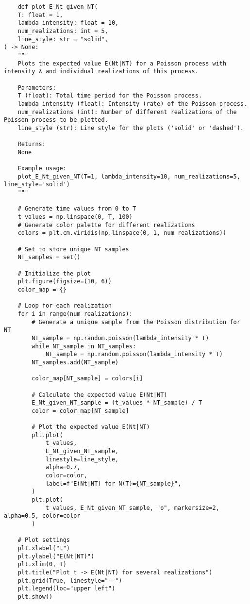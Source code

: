 \documentclass[12pt,letterpaper]{article}
\theoremstyle{definition}
\begin{document}
\begin{lstlisting}
    def plot_E_Nt_given_NT(
    T: float = 1,
    lambda_intensity: float = 10,
    num_realizations: int = 5,
    line_style: str = "solid",
) -> None:
    """
    Plots the expected value E(Nt|NT) for a Poisson process with intensity λ and individual realizations of this process.

    Parameters:
    T (float): Total time period for the Poisson process.
    lambda_intensity (float): Intensity (rate) of the Poisson process.
    num_realizations (int): Number of different realizations of the Poisson process to be plotted.
    line_style (str): Line style for the plots ('solid' or 'dashed').

    Returns:
    None

    Example usage:
    plot_E_Nt_given_NT(T=1, lambda_intensity=10, num_realizations=5, line_style='solid')
    """

    # Generate time values from 0 to T
    t_values = np.linspace(0, T, 100)
    # Generate color palette for different realizations
    colors = plt.cm.viridis(np.linspace(0, 1, num_realizations))

    # Set to store unique NT samples
    NT_samples = set()

    # Initialize the plot
    plt.figure(figsize=(10, 6))
    color_map = {}

    # Loop for each realization
    for i in range(num_realizations):
        # Generate a unique sample from the Poisson distribution for NT
        NT_sample = np.random.poisson(lambda_intensity * T)
        while NT_sample in NT_samples:
            NT_sample = np.random.poisson(lambda_intensity * T)
        NT_samples.add(NT_sample)

        color_map[NT_sample] = colors[i]

        # Calculate the expected value E(Nt|NT)
        E_Nt_given_NT_sample = (t_values * NT_sample) / T
        color = color_map[NT_sample]

        # Plot the expected value E(Nt|NT)
        plt.plot(
            t_values,
            E_Nt_given_NT_sample,
            linestyle=line_style,
            alpha=0.7,
            color=color,
            label=f"E(Nt|NT) for N(T)={NT_sample}",
        )
        plt.plot(
            t_values, E_Nt_given_NT_sample, "o", markersize=2, alpha=0.5, color=color
        )

    # Plot settings
    plt.xlabel("t")
    plt.ylabel("E(Nt|NT)")
    plt.xlim(0, T)
    plt.title("Plot t -> E(Nt|NT) for several realizations")
    plt.grid(True, linestyle="--")
    plt.legend(loc="upper left")
    plt.show()


\end{lstlisting}
\end{document}
